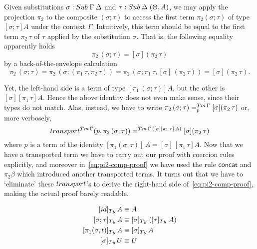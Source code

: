 \documentclass[a4paper,UKenglish,numberwithinsect,cleveref,thm-restate]{lipics-v2021}
\begin{document}
\begin{example}
  Given substitutions $\sigma : \Sub\;\Gamma\; \Delta$ and $\tau : \Sub\;\Delta\;(\Theta, A)$, we may apply the projection $\pi_2$ to the composite $(\sigma; \tau)$ to access the first term $\pi_2(\sigma; \tau)$ of type $[\sigma;\tau] A$ under the context $\Gamma$. 
  Intuitively, this term should be equal to the first term $\pi_2\,\tau$ of $\tau$ applied by the substitution $\sigma$. 
  That is, the following equality apparently holds
  \[
    \pi_2\,(\sigma ; \tau) = [\sigma] (\pi_2\,\tau)
  \]
  by a back-of-the-envelope calculation
  \begin{equation} \label{eq:pi2-comp-proof}
    \pi_2\,(\sigma ; \tau) 
    = \pi_2\,(\sigma; (\pi_1\,\tau, \pi_2\,\tau))
    = \pi_2\,(\sigma;\pi_1\,\tau, [\sigma]\,(\pi_2\,\tau))
    = [\sigma] (\pi_2\,\tau).
  \end{equation}

  Yet, the left-hand side is a term of type $[\pi_1\,(\sigma;\tau)] A$, but the other is $[\sigma] [\pi_1\,\tau] A$.
  Hence the above identity does not even make sense, since their types do not match.
  Alas, instead, we have to write $\pi_2\,(\sigma ; \tau) =^{\Tm\,\Gamma}_{p} [\sigma] (\pi_2\,\tau)$ or, more verbosely,
  \[
    \transfib{\Tm\,\Gamma}{p}{\pi_2\,(\sigma ; \tau)} =^{\Tm\,\Gamma\,([\sigma][\pi_1\,\tau]\,A)}  [\sigma] (\pi_2\,\tau)
  \]
  where $p$ is a term of the identity $[\pi_1(\sigma; \tau)]\,A = [\sigma]\,[\pi_1\,\tau]A$.
  Now that we have a transported term we have to carry out our proof with coercion rules explicitly, and moreover in~\eqref{eq:pi2-comp-proof} we have used the rule $\mathsf{concat}$ and $\pi_2\beta$ which introduced another transported terms.
  It turns out that we have to `eliminate' these $\transp$'s to derive the right-hand side of~\eqref{eq:pi2-comp-proof}, making the actual proof barely readable.
\end{example}
\begin{alignat*}{3}
[ \idS ]_{\Ty}\,A             & \jdeq A \\
[ \sigma ; \tau ]_{\Ty}\,A    & \jdeq [ \sigma ]_{\Ty}\;([ \tau ]_{\Ty}\;A) \\
[ \pi_1(\sigma, t) ]_{\Ty}\,A & \jdeq [\sigma]_\Ty\,A \\
[ \sigma ]_{\Ty}\,U           & \jdeq U
\end{alignat*}
\end{document}
